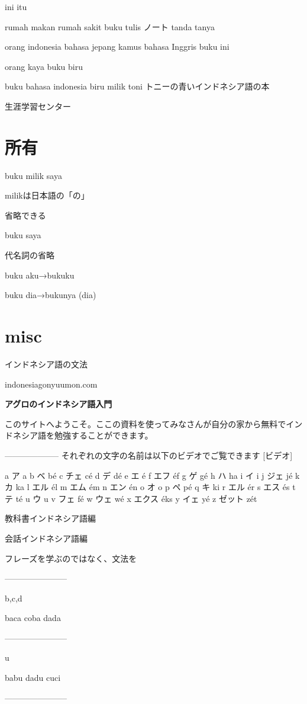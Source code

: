 \documentclass[uplatex]{jsarticle}
\theoremstyle{definition}
\begin{document}
ini itu

rumah makan rumah sakit buku tulis ノート tanda tanya

orang indonesia bahasa jepang kamus bahasa Inggris buku ini

orang kaya buku biru

buku bahasa indonesia biru milik toni トニーの青いインドネシア語の本

生涯学習センター

\section{所有}

buku milik saya

milikは日本語の「の」

省略できる

buku saya

代名詞の省略

buku aku→bukuku

buku dia→bukunya (dia)

\section{misc}

インドネシア語の文法

indonesiagonyuumon.com

\textbf{アグロのインドネシア語入門}


このサイトへようこそ。ここの資料を使ってみなさんが自分の家から無料でインドネシア語を勉強することができます。

-------------------- それぞれの文字の名前は以下のビデオでご覧できます
[ビデオ]

a ア a b ベ bé c チェ cé d デ dé e エ é f エフ éf g ゲ gé h ハ ha i イ i
j ジェ jé k カ ka l エル él m エム ém n エン én o オ o p ペ pé q キ ki r
エル ér s エス és t テ té u ウ u v フェ fé w ウェ wé x エクス éks y イェ
yé z ゼット zét

教科書インドネシア語編

会話インドネシア語編


フレーズを学ぶのではなく、文法を


-----------------------

b,c,d

baca coba dada

-----------------------

u

babu dadu cuci

-----------------------
\end{document}
